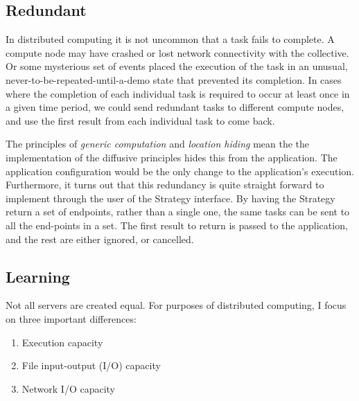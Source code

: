 \documentclass[11pt]{scrartcl}
\begin{document}


\subsection{Redundant}
In distributed computing it is not uncommon that a task fails to complete. A compute node may have crashed or lost network connectivity with the collective. Or some mysterious set of events placed the execution of the task in an unusual, never-to-be-repeated-until-a-demo state that prevented its completion. In cases where the completion of each individual task is required to occur at least once in a given time period, we could send redundant tasks to different compute nodes, and use the first result from each individual task to come back.

The principles of \emph{generic computation} and \emph{location hiding} mean the the implementation of the diffusive principles hides this from the application. The application configuration would be the only change to the application's execution. Furthermore, it turns out that this redundancy is quite straight forward to implement through the user of the \textsf{Strategy} interface. By having the \textsf{Strategy} return a set of endpoints, rather than a single one, the same tasks can be sent to all the end-points in a set. The first result to return is passed to the application, and the rest are either ignored, or cancelled.

\subsection{Learning}
Not all servers are created equal. For purposes of distributed computing, I focus on three important differences:
\begin{enumerate}
\item Execution capacity
\item File input-output (I/O) capacity
\item Network I/O capacity
\end{enumerate}
\end{document}
